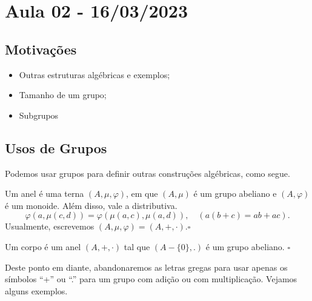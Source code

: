 \documentclass[algebra_notes.tex]{subfiles}
\begin{document}
\section{Aula 02 - 16/03/2023}
\subsection{Motivações}
\begin{itemize}
	\item Outras estruturas algébricas e exemplos;
	\item Tamanho de um grupo;
	\item Subgrupos
\end{itemize}
\subsection{Usos de Grupos}
Podemos usar grupos para definir outras construções algébricas, como segue.
\begin{def*}
	Um anel é uma terna $(A, \mu, \varphi)$, em que $(A, \mu)$ é um grupo abeliano e $(A, \varphi)$ é um monoide. Além disso,
	vale a distributiva.
	$$
		\varphi(a, \mu(c, d)) = \varphi(\mu(a, c), \mu(a, d)), \quad (a(b + c) = ab + ac).
	$$
	Usualmente, escrevemos $(A, \mu, \varphi) = (A, +, \cdot).\square$
\end{def*}
\begin{def*}
	Um corpo é um anel $(A, +, \cdot)$ tal que $(A-\{0\}, .)$ é um grupo abeliano. $\square$
\end{def*}
Deste ponto em diante, abandonaremos as letras gregas para usar apenas os símbolos ``+'' ou ``.'' para um grupo com adição
ou com multiplicação. Vejamos alguns exemplos.
\end{document}
